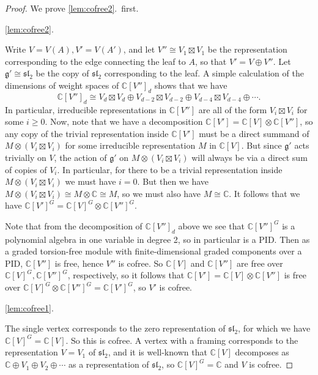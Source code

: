 \documentclass[12pt]{article}
\newcommand{\C}{\mathbb{C}}
\renewcommand{\sl}{\mathfrak{sl}}
\theoremstyle{definition}
\theoremstyle{remark}
\newcommand{\g}{\mathfrak{g}}
\begin{document}
\begin{proof}
We prove \ref{lem:cofree2}.~first.

\ref{lem:cofree2}.

Write $V=V(A),V'=V(A')$, and let $V''\cong V_1\boxtimes V_1$ be the representation corresponding to the edge connecting the leaf to $A$, so that $V'=V\oplus V''$. Let $\g'\cong\sl_2$ be the copy of $\sl_2$ corresponding to the leaf. A simple calculation of the dimensions of weight spaces of $\C[V'']_d$ shows that we have
\[\C[V'']_d\cong V_d\boxtimes V_d\oplus V_{d-2}\boxtimes V_{d-2}\oplus V_{d-4}\boxtimes V_{d-4}\oplus\cdots.\]
In particular, irreducible representations in $\C[V'']$ are all of the form $V_i\boxtimes V_i$ for some $i\geq 0$. Now, note that we have a decomposition $\C[V']=\C[V]\otimes\C[V'']$, so any copy of the trivial representation inside $\C[V']$ must be a direct summand of $M\otimes (V_i\boxtimes V_i)$ for some irreducible representation $M$ in $\C[V]$. But since $\g'$ acts trivially on $V$, the action of $\g'$ on $M\otimes (V_i\boxtimes V_i)$ will always be via a direct sum of copies of $V_i$. In particular, for there to be a trivial representation inside $M\otimes (V_i\boxtimes V_i)$ we must have $i=0$. But then we have $M\otimes (V_i\boxtimes V_i)\cong M\otimes\C\cong M$, so we must also have $M\cong\C$. It follows that we have $\C[V']^G=\C[V]^G\otimes\C[V'']^G$.

Note that from the decomposition of $\C[V'']_d$ above we see that $\C[V'']^G$ is a polynomial algebra in one variable in degree 2, so in particular is a PID. Then as a graded torsion-free module with finite-dimensional graded components over a PID, $\C[V'']$ is free, hence $V''$ is cofree. So $\C[V]$ and $\C[V'']$ are free over $\C[V]^G,\C[V'']^G$, respectively, so it follows that $\C[V']=\C[V]\otimes\C[V'']$ is free over $\C[V]^G\otimes\C[V'']^G=\C[V']^G$, so $V'$ is cofree.

\ref{lem:cofree1}.

The single vertex corresponds to the zero representation of $\sl_2$, for which we have $\C[V]^G=\C[V]$. So this is cofree. A vertex with a framing corresponds to the representation $V=V_1$ of $\sl_2$, and it is well-known that $\C[V]$ decomposes as $\C\oplus V_1\oplus V_2\oplus\cdots$ as a representation of $\sl_2$, so $\C[V]^G=\C$ and $V$ is cofree.


\end{proof}
\end{document}
